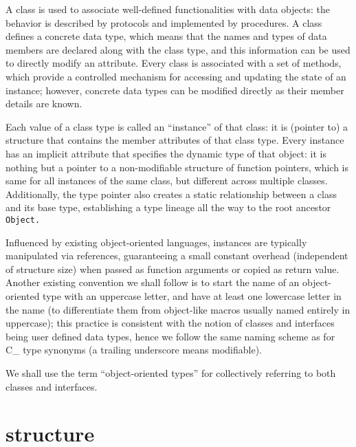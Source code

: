 \def\Section#1{\section{#1}}

A class is used to associate well-defined functionalities with data objects:
the behavior is described by protocols and implemented by procedures.
A class defines a concrete data type, which means that the names
and types of data members are declared along with the class type,
and this information can be used to directly modify an attribute.
Every class is associated with a set of methods, which provide a controlled
mechanism for accessing and updating the state of an instance; however,
concrete data types can be modified directly as their member details are known.

Each value of a class type is called an ``instance''
of that class: it is (pointer to) a structure that
contains the member attributes of that class type.
Every instance has an implicit attribute that specifies the dynamic
type of that object: it is nothing but a pointer to a non-modifiable
structure of function pointers, which is same for all instances
of the same class, but different across multiple classes.
Additionally, the type pointer also creates a static
relationship between a class and its base type, establishing
a type lineage all the way to the root ancestor \tt{Object}.

Influenced by existing object-oriented languages, instances are typically
manipulated via references, guaranteeing a small constant overhead (independent
of structure size) when passed as function arguments or copied as return value.
Another existing convention we shall follow is to start the name of an
object-oriented type with an uppercase letter, and have at least one lowercase
letter in the name (to differentiate them from object-like macros usually named
entirely in uppercase); this practice is consistent with the notion of classes
and interfaces being user defined data types, hence we follow the same naming
scheme as for C\_ type synonyms (a trailing underscore means modifiable).

\note We shall use the term ``object-oriented types''
for collectively referring to both classes and interfaces.

\section{ structure}


